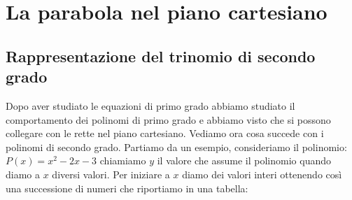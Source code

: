 
\chapter{La parabola nel piano cartesiano}

\section{Rappresentazione del trinomio di secondo grado}
\label{sec:parabola_rappresentazionetrinomio}

Dopo aver studiato le equazioni di primo grado abbiamo studiato il 
comportamento dei polinomi di primo grado e abbiamo visto che si possono 
collegare con le rette nel piano cartesiano. Vediamo ora cosa succede con i
polinomi di secondo grado. Partiamo da un esempio, consideriamo il polinomio: 
$P(x)=x^2 -2x -3$ chiamiamo $y$ il valore che assume il polinomio quando diamo 
a $x$ diversi valori. Per iniziare a $x$ diamo dei valori interi ottenendo così 
una successione di numeri che riportiamo in una tabella:

